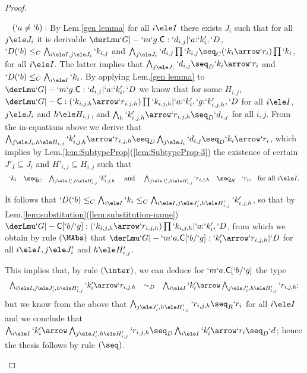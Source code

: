 \documentclass{CSML}
\begin{document}
\begin{proof}
\begin{description}
~\kern-10mm $(`a \neq `b):$
By Lem.\skp\ref{gen lemma} for all $i\ele I$ there exists $J_i$ such that
for all $j\ele J_i$ it is derivable $\derLmu `G |- {`m`g.\Cmd} : `d_{i,j} | `a{:}`k'_i,`D $,
$`D(`b) \leq_C \bigwedge_{i\ele I,j\ele J_i} `k_{i,j}$ and $\bigwedge_{j\ele J_i} `d_{i,j}\prod`k_{i,j} 
\seq_C (`k_i\arrow`r_i)\prod`k_i$, for all $i\ele I$. The latter implies that 
$\bigwedge_{j\ele J_i} `d_{i,j} \seq_D `k_i\arrow`r_i$ and
$`D(`b) \leq_C \bigwedge_{i\ele I}`k_i$. 
%
By applying Lem.\skp\ref{gen lemma} to $\derLmu `G |- {`m`g.\Cmd} : `d_{i,j} | `a{:}`k'_i,`D $ we know that for some $H_{i,j}$,
$\derLmu `G |- {\Cmd} : (`k_{i,j,h}\arrow`r_{i,j,h})\prod`k_{i,j,h} | `a{:}`k'_i, `g{:}`k'_{i,j,h},`D $
for all $i\ele I$, $j\ele J_i$ and $h\ele H_{i,j}$, and $\bigwedge_{h} `k'_{i,j,h}\arrow`r_{i,j,h} \seq_D `d_{i,j}$ for all $i,j$.
%
From the in-equations above we derive that 
$\bigwedge_{j\ele J_i,h\ele H_{i,j}} `k'_{i,j,h}\arrow`r_{i,j,h} \seq_D \bigwedge_{j\ele J_i}`d_{i,j} \seq_D `k_i\arrow`r_i$, 
which
implies by Lem.\skp\ref{lem:SubtypeProp}\skp(\ref{lem:SubtypeProp-3}) 
the existence of certain $J'_I \subseteq J_i$ and $H'_{i,j} \subseteq H_{i,j}$ such that
\[ \begin{array}{rcl@{\quad}c@{\quad}rcl@{\quad}l}
`k_i &\seq_C& \bigwedge_{j\ele J'_i,h\ele H'_{i,j}} `k'_{i,j,h}
&\textrm{ and } &
\bigwedge_{j\ele J'_i,h\ele H'_{i,j}} `r_{i,j,h} &\seq_R& `r_i, & 
\textrm{for all }i\ele I.
 \end{array} \]

It follows that $`D(`b) \leq_C \bigwedge_{i\ele I}`k_i \leq_C \bigwedge_{i\ele I,j\ele J'_i,h\ele H'_{i,j}} `k'_{i,j,h}$, so that
by Lem.\skp\ref{lem:substitution}\skp(\ref{lem:substitution-name}) 
$\derLmu `G |- {\Cmd[`b/`g]} : (`k_{i,j,h}\arrow`r_{i,j,h})\prod`k_{i,j,h} | `a{:}`k'_i,`D $, from which we 
obtain by rule $(\MAbs)$ that 
$\derLmu `G |- {`m`a.\Cmd[`b/`g]} : `k'_i\arrow`r_{i,j,h} | `D $
for all $i\ele I, j\ele J'_i$ and $h\ele H'_{i,j}$.

This implies that, by rule $(\inter)$, we can deduce for $`m`a.\textrm{\sf C}[`b/`g]$ the type 
 \[ \begin{array}{rcl} 
\bigwedge_{i\ele I, j\ele J'_i,h\ele H'_{i,j}} `k'_i\arrow`r_{i,j,h} &\sim_D& 
\bigwedge_{i\ele I} `k'_i\arrow\bigwedge_{j\ele J'_i,h\ele H'_{i,j}}`r_{i,j,h} ;
 \end{array} \] 
but we know from the above that $\bigwedge_{j\ele J'_i,h\ele H'_{i,j}}`r_{i,j,h} \seq_R `r_i$ for all $i\ele I$ and we conclude that
$\bigwedge_{i\ele I} `k'_i\arrow\bigwedge_{j\ele J'_i,h\ele H'_{i,j}}`r_{i,j,h} \seq_D \bigwedge_{i\ele I} `k'_i\arrow`r_i
\seq_D `d$; hence the thesis follows by rule $(\seq)$.
	

\end{description}
\end{proof}
\end{document}
